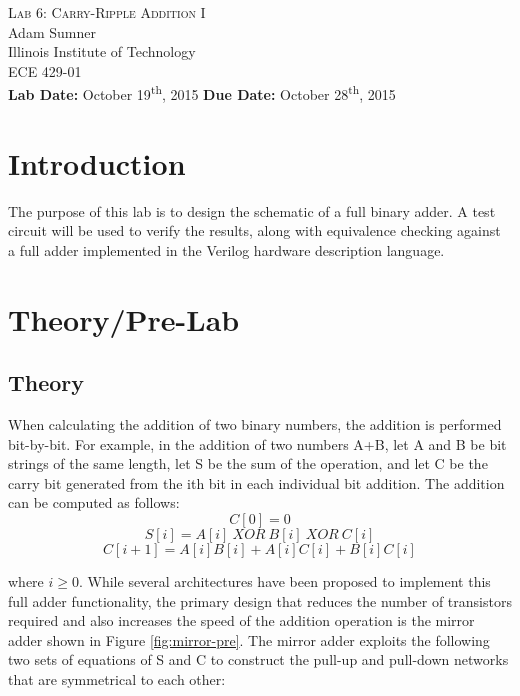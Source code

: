 \documentclass[12pt]{article}
\begin{document}
\begin{titlepage}
	\begin{center}
		
		
		\vfill
		
		\textsc{\LARGE Lab 6: Carry-Ripple Addition I}\\[1.5cm]
		
		\Large Adam Sumner\\[0.5cm]
		
		\Large Illinois Institute of Technology\\[0.5cm]
		
		\Large ECE 429-01\\[0.5cm]	
		
		\noindent
		\vfill
		\large \textbf{Lab Date:} October 19\textsuperscript{th}, 2015\hfill
		\large \textbf{Due Date:} October 28\textsuperscript{th}, 2015
	
		
	\end{center}
\end{titlepage}

\section{Introduction}
The purpose of this lab is to design the schematic of a full binary adder. A test circuit will  be used to verify the results, along with equivalence checking against a full adder implemented in the Verilog hardware description language. 
\section{Theory/Pre-Lab}
\subsection{Theory}
When calculating the addition of two binary numbers, the addition is performed bit-by-bit. For example, in the addition of two numbers A+B, let A and B be bit strings of the same length, let S be the sum of the operation, and let C be the carry bit generated from the ith bit in each individual bit addition. The addition can be computed as follows:
$$C[0]=0$$
$$S[i]=A[i] \ XOR \ B[i]  \ XOR \ C[i]$$
$$C[i+1]=A[i]B[i] + A[i]C[i]+B[i]C[i]$$

\noindent where $i \geq 0$. While several architectures have been proposed to implement this full adder functionality, the primary design that reduces the number of transistors required and also increases the speed of the addition operation is the mirror adder shown in Figure \ref{fig:mirror-pre}. The mirror adder exploits the following two sets of equations of S and C to construct the pull-up and pull-down networks that are symmetrical to each other:
\end{document}
